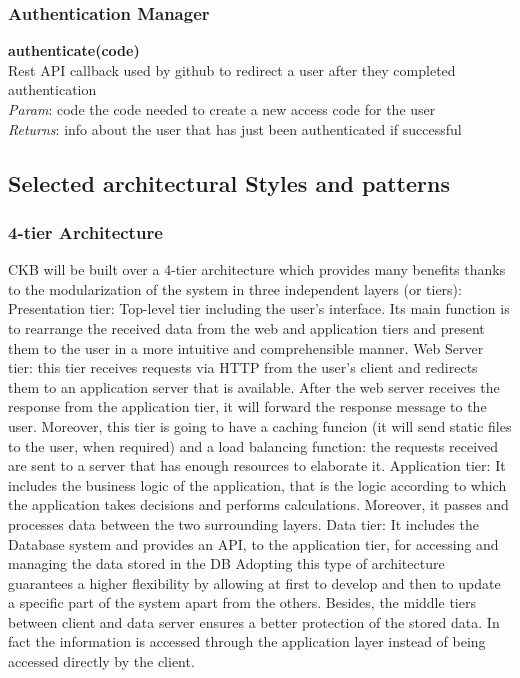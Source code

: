 \documentclass{article}
\begin{document}
\subsubsection{Authentication Manager}
\textbf{authenticate(code)}\\
Rest API callback used by github to redirect a user after they completed authentication\\
\textit{Param}: code the code needed to create a new access code for the user\\
\textit{Returns}: info about the user that has just been authenticated if successful\\


\subsection{Selected architectural Styles and patterns}
\subsubsection{4-tier Architecture}
CKB will be built over a 4-tier architecture which provides many benefits thanks to the modularization of the system in three independent layers (or tiers):
Presentation tier: Top-level tier including the user’s interface. Its main function is to rearrange the received data from the web and application tiers and present them to the user in a more intuitive and comprehensible manner.
Web Server tier: this tier receives requests via HTTP from the user’s client and redirects them to an application server that is available. After the web server receives the response from the application tier, it will forward the response message to the user. Moreover, this tier is going to have a caching funcion (it will send static files to the user, when required) and a load balancing function: the requests received are sent to a server that has enough resources to elaborate it.
Application tier: It includes the business logic of the application, that is the logic according to which the application takes decisions and performs calculations. Moreover, it passes and processes data between the two surrounding layers.
 Data tier: It includes the Database system and provides an API, to the application tier, for accessing and managing the data stored in the DB
Adopting this type of architecture guarantees a higher flexibility by allowing at first to develop and then to update a specific part of the system apart from the others. Besides, the middle tiers between client and data server ensures a better protection of the stored data. In fact the information is accessed through the application layer instead of being accessed directly by the client.
\end{document}
